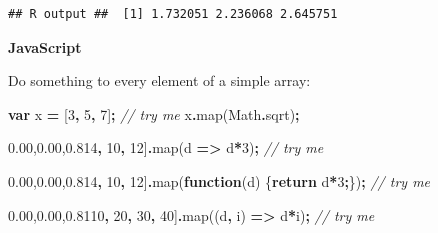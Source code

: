 \documentclass[
  openany]{book}
\newenvironment{Shaded}{\begin{snugshade}}{\end{snugshade}}
\newcommand{\BuiltInTok}[1]{#1}
\newcommand{\CommentTok}[1]{\textcolor[rgb]{0.56,0.35,0.01}{\textit{#1}}}
\newcommand{\ControlFlowTok}[1]{\textcolor[rgb]{0.13,0.29,0.53}{\textbf{#1}}}
\newcommand{\DecValTok}[1]{\textcolor[rgb]{0.00,0.00,0.81}{#1}}
\newcommand{\FunctionTok}[1]{\textcolor[rgb]{0.00,0.00,0.00}{#1}}
\newcommand{\KeywordTok}[1]{\textcolor[rgb]{0.13,0.29,0.53}{\textbf{#1}}}
\newcommand{\NormalTok}[1]{#1}
\newcommand{\OperatorTok}[1]{\textcolor[rgb]{0.81,0.36,0.00}{\textbf{#1}}}
\begin{document}
\begin{verbatim}
## R output ##  [1] 1.732051 2.236068 2.645751
\end{verbatim}

\textbf{JavaScript}

Do something to every element of a simple array:

\begin{Shaded}
\begin{Highlighting}[]
\KeywordTok{var}\NormalTok{ x }\OperatorTok{=}\NormalTok{ [}\DecValTok{3}\OperatorTok{,} \DecValTok{5}\OperatorTok{,} \DecValTok{7}\NormalTok{]}\OperatorTok{;}     \CommentTok{// try me}
\NormalTok{x}\OperatorTok{.}\FunctionTok{map}\NormalTok{(}\BuiltInTok{Math}\OperatorTok{.}\FunctionTok{sqrt}\NormalTok{)}\OperatorTok{;}
\end{Highlighting}
\end{Shaded}

\begin{Shaded}
\begin{Highlighting}[]
\NormalTok{[}\DecValTok{4}\OperatorTok{,} \DecValTok{10}\OperatorTok{,} \DecValTok{12}\NormalTok{]}\OperatorTok{.}\FunctionTok{map}\NormalTok{(d }\KeywordTok{=\textgreater{}}\NormalTok{ d}\OperatorTok{*}\DecValTok{3}\NormalTok{)}\OperatorTok{;}     \CommentTok{// try me}
\end{Highlighting}
\end{Shaded}

\begin{Shaded}
\begin{Highlighting}[]
\NormalTok{[}\DecValTok{4}\OperatorTok{,} \DecValTok{10}\OperatorTok{,} \DecValTok{12}\NormalTok{]}\OperatorTok{.}\FunctionTok{map}\NormalTok{(}\KeywordTok{function}\NormalTok{(d) \{}\ControlFlowTok{return}\NormalTok{ d}\OperatorTok{*}\DecValTok{3}\OperatorTok{;}\NormalTok{\})}\OperatorTok{;}     \CommentTok{// try me}
\end{Highlighting}
\end{Shaded}

\begin{Shaded}
\begin{Highlighting}[]
\NormalTok{[}\DecValTok{10}\OperatorTok{,} \DecValTok{20}\OperatorTok{,} \DecValTok{30}\OperatorTok{,} \DecValTok{40}\NormalTok{]}\OperatorTok{.}\FunctionTok{map}\NormalTok{((d}\OperatorTok{,}\NormalTok{ i) }\KeywordTok{=\textgreater{}}\NormalTok{ d}\OperatorTok{*}\NormalTok{i)}\OperatorTok{;}     \CommentTok{// try me}
\end{Highlighting}
\end{Shaded}
\end{document}
